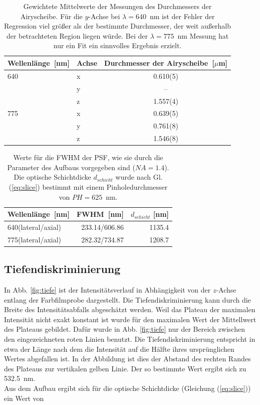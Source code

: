 \begin{table}
	\centering
	\caption{
		Gewichtete Mittelwerte der Messungen des Durchmessers der Airyscheibe.
Für die $y$-Achse bei $\lambda = 640$~nm ist der Fehler der Regression viel größer als der bestimmte Durchmesser, der weit außerhalb der betrachteten Region liegen würde.
Bei der $\lambda = 775$~nm Messung hat nur ein Fit ein sinnvolles Ergebnis erzielt.}
	\begin{tabular}{l|l|c}
		Wellenlänge~[nm] & Achse & Durchmesser der Airyscheibe~[$\mu$m] \\ \hline 
		640 & x & 0.610(5)\\
		    &y& --\\ 
		    &z& 1.557(4)\\ \hline
		775 &x& 0.639(5)\\
		    &y& 0.761(8)\\
		    &z& 1.546(8)\\
	\end{tabular}\label{tab:psffits}

\end{table}

\begin{table}
	\centering
	\caption{Werte für die FWHM der PSF, wie sie durch die Parameter des Aufbaus vorgegeben sind ($NA=1.4$). Die optische Schichtdicke $d_{schicht}$ wurde nach Gl. (\ref{eq:slice}) bestimmt mit einem Pinholedurchmesser von $PH = 625$~nm.}\label{tab:fwhmaufbau}
	\begin{tabular}{l|rr}
		Wellenlänge~[nm] & FWHM~[nm] & $d_{schicht}$ [nm]\\ \hline
		640(lateral/axial) & 233.14/606.86 & 1135.4\\
		775(lateral/axial) & 282.32/734.87 & 1208.7
	\end{tabular}
\end{table}

\subsection{Tiefendiskriminierung}
In Abb. \ref{fig:tiefe} ist der Intensitätsverlauf in Abhängigkeit von der $z$-Achse entlang der Farbfilmprobe dargestellt.
Die Tiefendiskriminierung kann durch die Breite des Intensitätsabfalls abgeschätzt werden.
Weil das Plateau der maximalen Intensität nicht exakt konstant ist wurde für den maximalen Wert der Mittellwert des Plateaus gebildet.
Dafür wurde in Abb. \ref{fig:tiefe} nur der Bereich zwischen den eingezeichneten roten Linien benutzt.
Die Tiefendiskriminierung entspricht in etwa der Länge nach dem die Intensität auf die Hälfte ihres ursprünglichen Wertes abgefallen ist.
In der Abbildung ist dies der Abstand des rechten Randes des Plateaus zur vertikalen gelben Linie.
Der so bestimmte Wert ergibt sich zu 532.5~nm.
\\
Aus dem Aufbau ergibt sich für die optische Schichtdicke (Gleichung (\ref{eq:slice})) ein Wert von 


